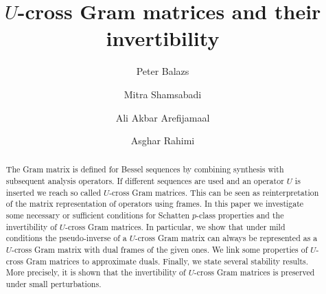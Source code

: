 \documentclass{birkjour}
\theoremstyle{definition}
\theoremstyle{remark}
\numberwithin{equation}{section}
\begin{document}
\title[$U$-cross Gram matrices and their invertibility]
 {$U$-cross Gram matrices and their invertibility}


\author[P. Balazs]{{Peter Balazs}}
\address{ Acoustics Research Institute
 Austrian Academy of Sciences, Vienna, AUSTRIA.}

\author[M. Shamsabadi]{Mitra Shamsabadi}
\address{Department of Mathematics and Computer Sciences, Hakim Sabzevari University, Sabzevar, IRAN.}



\author[A. Arefijamaal]{Ali Akbar Arefijamaal}
\address{Department of Mathematics and Computer Sciences, Hakim Sabzevari University, Sabzevar, IRAN.}





\author[A. Rahimi]{Asghar Rahimi}
\address{ Department of Mathematics, University of Maragheh,
Maragheh, IRAN.}






\begin{abstract}
The Gram matrix is defined for Bessel sequences by combining
synthesis  with subsequent analysis operators. If different
sequences are used and an operator $U$ is inserted we reach so called
$U$-cross Gram matrices. This can be seen as reinterpretation of
the matrix representation of operators using frames. In this paper
we investigate some necessary or sufficient conditions for
Schatten $p$-class properties and the invertibility of $U$-cross
Gram matrices. In particular, we show that under mild conditions
the pseudo-inverse of a $U$-cross Gram matrix can always be
represented as a $U$-cross Gram matrix with dual frames of the given
ones. We link some properties of $U$-cross Gram matrices to approximate duals.
Finally, we state several stability results. More precisely, it is
shown that the invertibility of $U$-cross Gram matrices is preserved
under small perturbations.
\end{abstract}
\maketitle
\end{document}
